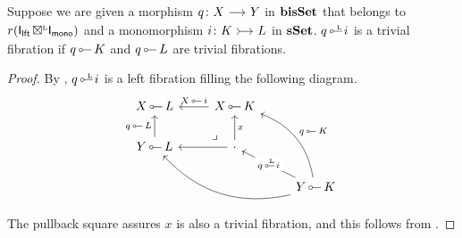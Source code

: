 \documentclass[a4paper,  dvipsnames, 11pt]{amsart}
\begin{document}
\begin{proposition}
	\label{prop:bLeftbiFibvsTrivfib}
	Suppose we are given a morphism $q\colon X\arr Y$ in $\mathbf{bisSet}$ that belongs to $r(\mathsf{I}_{\mathsf{lft}}{\mathrel{\,\boxtimes^{\text{\tiny{L}}}}}\mathsf{I}_{\mathsf{mono}})$
	and a monomorphism $i\colon K\arr[tail]L$ in $\mathbf{sSet}$.
	$q\lollipopL i$ is a trivial fibration if $q\lollipop K$ and $q\lollipop L$ are trivial fibrations.
\end{proposition}
\begin{proof}
	By , $q\lollipopL i$ is a left fibration filling the following diagram.
	\[
		\begin{tikzcd}
			X\lollipop L
			\al[r,"X\lollipop i"]
			\al[d,"q\lollipop L"']
				&
				X\lollipop K
				\al[d,"x"]
				\al[rdd,bend left,"q\lollipop K"]
					&
			\\
			Y\lollipop L
			\al[r]
			\al[rrd,bend right]
				&
				\cdot
				\al[rd,"{q\lollipopL i}"description]
				\pullback[lu]
					&
			\\
				&
					&
					Y\lollipop K
		\end{tikzcd}
	\]
	The pullback square assures $x$ is also a trivial fibration, and this follows from .
\end{proof}
\end{document}
